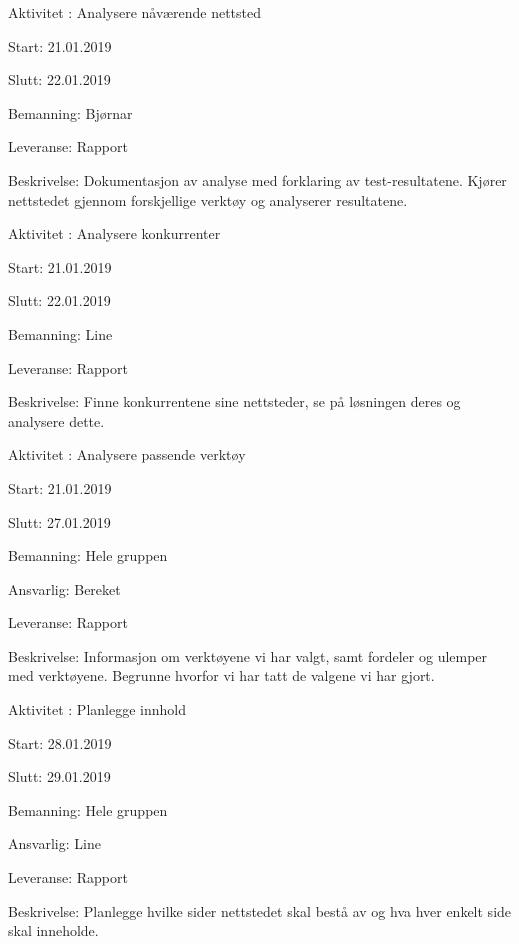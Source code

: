 \documentclass[11pt,a4paper]{report}
\begin{document}
\begin{compactdesc}
	\item [Aktivitet \arabic{aktivitetTeller}:] Analysere nåværende nettsted
	\begin{compactitem}
	\item Start: 21.01.2019
	\item Slutt: 22.01.2019
	\item Bemanning: Bjørnar
	\item Leveranse: Rapport
	\item Beskrivelse: Dokumentasjon av analyse med forklaring av test-resultatene. Kjører nettstedet gjennom forskjellige verktøy og analyserer resultatene.
	\addtocounter{aktivitetTeller}{1}
	\end{compactitem}
	
	\item [Aktivitet \arabic{aktivitetTeller}:] Analysere konkurrenter
	\begin{compactitem}
	\item Start: 21.01.2019
	\item Slutt: 22.01.2019
	\item Bemanning: Line
	\item Leveranse: Rapport
	\item Beskrivelse: Finne konkurrentene sine nettsteder, se på løsningen deres og analysere dette.
	\addtocounter{aktivitetTeller}{1}
	\end{compactitem}
	
	\item [Aktivitet \arabic{aktivitetTeller}:] Analysere passende verktøy
	\begin{compactitem}
	\item Start: 21.01.2019
	\item Slutt: 27.01.2019
	\item Bemanning: Hele gruppen
	\item Ansvarlig: Bereket
	\item Leveranse: Rapport
	\item Beskrivelse: Informasjon om verktøyene vi har valgt, samt fordeler og ulemper med verktøyene. Begrunne hvorfor vi har tatt de valgene vi har gjort.
	\addtocounter{aktivitetTeller}{1}
	\end{compactitem}
	
	\item [Aktivitet \arabic{aktivitetTeller}:] Planlegge innhold
	\begin{compactitem}
	\item Start: 28.01.2019
	\item Slutt: 29.01.2019
	\item Bemanning: Hele gruppen
	\item Ansvarlig: Line
	\item Leveranse: Rapport
	\item Beskrivelse: Planlegge hvilke sider nettstedet skal bestå av og hva hver enkelt side skal inneholde.
	\addtocounter{aktivitetTeller}{1}
	\end{compactitem}
	

\end{compactdesc}
\end{document}
